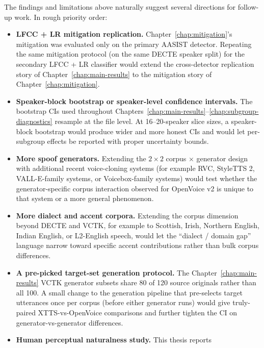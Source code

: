 The findings and limitations above naturally suggest several
directions for follow-up work. In rough priority order:

\begin{itemize}
    \item \textbf{LFCC + LR mitigation replication.} Chapter~\ref{chap:mitigation}'s mitigation
        was evaluated only on the primary AASIST detector. Repeating
        the same mitigation protocol (on the same DECTE speaker split)
        for the secondary LFCC + LR classifier would extend the
        cross-detector replication story of Chapter~\ref{chap:main-results} to the
        mitigation story of Chapter~\ref{chap:mitigation}.
    \item \textbf{Speaker-block bootstrap or speaker-level confidence
        intervals.} The bootstrap CIs used throughout Chapters~\ref{chap:main-results}--\ref{chap:subgroup-diagnostics}
        resample at the file level. At 16--20-speaker slice sizes, a
        speaker-block bootstrap would produce wider and more honest
        CIs and would let per-subgroup effects be reported with
        proper uncertainty bounds.
    \item \textbf{More spoof generators.} Extending the $2 \times 2$ corpus $\times$
        generator design with additional recent voice-cloning systems
        (for example RVC, StyleTTS 2, VALL-E-family systems, or
        Voicebox-family systems) would test whether the
        generator-specific corpus interaction observed for OpenVoice
        v2 is unique to that system or a more general phenomenon.
    \item \textbf{More dialect and accent corpora.} Extending the corpus
        dimension beyond DECTE and VCTK, for example to Scottish,
        Irish, Northern English, Indian English, or L2-English
        speech, would let the ``dialect / domain gap'' language
        narrow toward specific accent contributions rather than
        bulk corpus differences.
    \item \textbf{A pre-picked target-set generation protocol.} The
        Chapter~\ref{chap:main-results} VCTK generator subsets share 80 of 120 source
        originals rather than all 100. A small change to the
        generation pipeline that pre-selects target utterances once
        per corpus (before either generator runs) would give
        truly-paired XTTS-vs-OpenVoice comparisons and further
        tighten the CI on generator-vs-generator differences.
    \item \textbf{Human perceptual naturalness study.} This thesis reports

\end{itemize}
